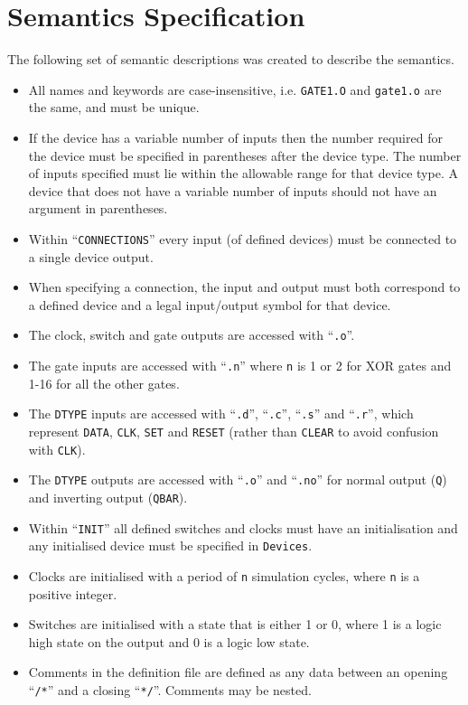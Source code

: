 \documentclass[a4paper,11pt]{article}  %
\begin{document}
\section{Semantics Specification}

The following set of semantic descriptions was created to describe the
semantics.
\begin{itemize}
 \item All names and keywords are case-insensitive,
   i.e. \texttt{GATE1.O} and \texttt{gate1.o} are the same, and must
   be unique. 
  \item If the device has a variable number of inputs then the number
    required for the device must be specified in parentheses after the
    device type. The number of inputs specified must lie within the
    allowable range for that device type. A device that does not have
    a variable number of inputs should not have an argument in
    parentheses.
  \item Within ``\texttt{CONNECTIONS}'' every input (of defined
    devices) must be connected to a single device output.
  \item When specifying a connection, the input and output must both
    correspond to a defined device and a legal input/output symbol for
    that device.
  \item The clock, switch and gate outputs are accessed with
    ``\texttt{.o}''.
  \item The gate inputs are accessed with ``\texttt{.n}'' where
    \texttt{n} is 1 or 2 for XOR gates and 1-16 for all the other
    gates.
  \item The \texttt{DTYPE} inputs are accessed with ``\texttt{.d}'',
    ``\texttt{.c}'', ``\texttt{.s}'' and ``\texttt{.r}'', which
    represent \texttt{DATA}, \texttt{CLK}, \texttt{SET} and
    \texttt{RESET} (rather than \texttt{CLEAR} to avoid confusion with
    \texttt{CLK}).
  \item The \texttt{DTYPE} outputs are accessed with ``\texttt{.o}''
    and ``\texttt{.no}'' for normal output (\texttt{Q}) and inverting
    output (\texttt{QBAR}).
  \item Within ``\texttt{INIT}'' all defined switches and clocks must
    have an initialisation and any initialised device must be
    specified in \texttt{Devices}.
  \item Clocks are initialised with a period of \texttt{n} simulation
    cycles, where \texttt{n} is a positive integer.
  \item Switches are initialised with a state that is either 1 or 0,
    where 1 is a logic high state on the output and 0 is a logic low
    state.
  \item Comments in the definition file are defined as any data
    between an opening ``\texttt{/*}'' and a closing ``\texttt{*/}''. Comments may be
    nested.
\end{itemize}
\end{document}
